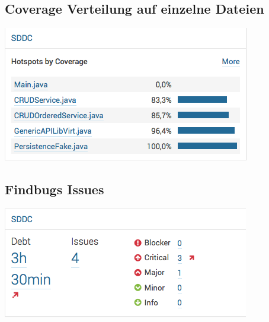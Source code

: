 \documentclass[11pt]{scrartcl}
\begin{document}
\subsection{Coverage Verteilung auf einzelne Dateien}
\includegraphics[]{covergaeperfile}

\subsection{Findbugs Issues}
\includegraphics[]{issues}
\end{document}
